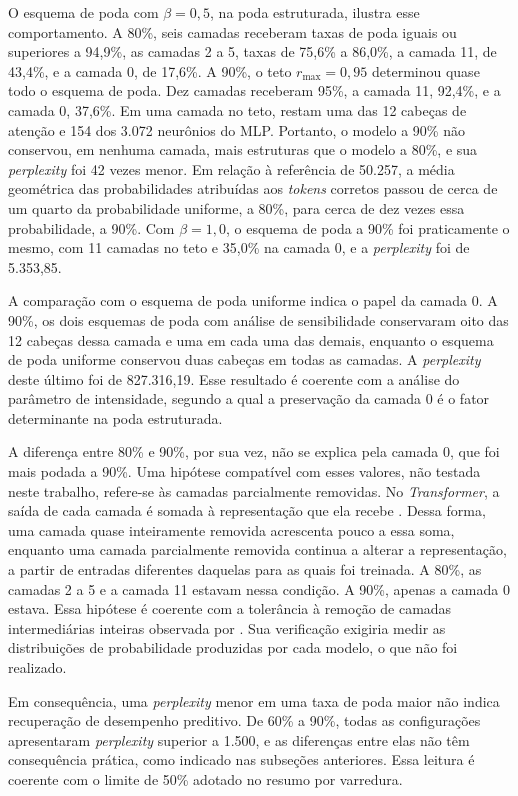 O esquema de poda com $\beta = 0{,}5$, na poda estruturada, ilustra esse comportamento. A 80\%,
seis camadas receberam taxas de poda iguais ou superiores a 94,9\%, as camadas 2 a 5, taxas de
75,6\% a 86,0\%, a camada 11, de 43,4\%, e a camada 0, de 17,6\%. A 90\%, o teto $r_{\max} =
0{,}95$ determinou quase todo o esquema de poda. Dez camadas receberam 95\%, a camada 11,
92,4\%, e a camada 0, 37,6\%. Em uma camada no teto, restam uma das 12 cabeças de atenção e 154
dos 3.072 neurônios do MLP. Portanto, o modelo a 90\% não conservou, em nenhuma camada, mais
estruturas que o modelo a 80\%, e sua \textit{perplexity} foi 42 vezes menor. Em relação à
referência de 50.257, a média geométrica das probabilidades atribuídas aos \textit{tokens}
corretos passou de cerca de um quarto da probabilidade uniforme, a 80\%, para cerca de dez
vezes essa probabilidade, a 90\%. Com $\beta = 1{,}0$, o esquema de poda a 90\% foi
praticamente o mesmo, com 11 camadas no teto e 35,0\% na camada 0, e a \textit{perplexity} foi
de 5.353,85.

A comparação com o esquema de poda uniforme indica o papel da camada 0. A 90\%, os dois
esquemas de poda com análise de sensibilidade conservaram oito das 12 cabeças dessa camada e
uma em cada uma das demais, enquanto o esquema de poda uniforme conservou duas cabeças em todas
as camadas. A \textit{perplexity} deste último foi de 827.316,19. Esse resultado é coerente com
a análise do parâmetro de intensidade, segundo a qual a preservação da camada 0 é o fator
determinante na poda estruturada.

A diferença entre 80\% e 90\%, por sua vez, não se explica pela camada 0, que foi mais podada a
90\%. Uma hipótese compatível com esses valores, não testada neste trabalho, refere-se às
camadas parcialmente removidas. No \textit{Transformer}, a saída de cada camada é somada à
representação que ela recebe \cite{Vaswani2017}. Dessa forma, uma camada quase inteiramente
removida acrescenta pouco a essa soma, enquanto uma camada parcialmente removida continua a
alterar a representação, a partir de entradas diferentes daquelas para as quais foi treinada. A
80\%, as camadas 2 a 5 e a camada 11 estavam nessa condição. A 90\%, apenas a camada 0 estava.
Essa hipótese é coerente com a tolerância à remoção de camadas intermediárias inteiras observada por
. Sua verificação exigiria medir as distribuições de probabilidade
produzidas por cada modelo, o que não foi realizado.

Em consequência, uma \textit{perplexity} menor em uma taxa de poda maior não indica recuperação
de desempenho preditivo. De 60\% a 90\%, todas as configurações apresentaram
\textit{perplexity} superior a 1.500, e as diferenças entre elas não têm consequência prática,
como indicado nas subseções anteriores. Essa leitura é coerente com o limite de 50\% adotado no
resumo por varredura.

